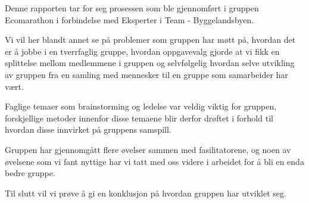 Denne rapporten tar for seg prosessen som ble gjennomført i gruppen Ecomarathon i forbindelse med Eksperter i Team - Byggelandsbyen.

Vi vil her blandt annet se på problemer som gruppen har møtt på, hvordan det er å jobbe i en tverrfaglig gruppe, hvordan oppgavevalg gjorde at vi fikk en splittelse mellom medlemmene i gruppen og selvfølgelig hvordan selve utvikling av gruppen fra en samling med mennesker til en gruppe som samarbeider har vært.

Faglige temaer som brainstorming og ledelse var veldig viktig for gruppen, forskjellige metoder innenfor disse temaene blir derfor drøftet i forhold til hvordan disse innvirket på gruppens samspill.

Gruppen har gjennomgått flere øvelser sammen med fasilitatorene, og noen av øvelsene som vi fant nyttige har vi tatt med oss videre i arbeidet for å bli en enda bedre gruppe.

Til slutt vil vi prøve å gi en konklusjon på hvordan gruppen har utviklet seg. 
